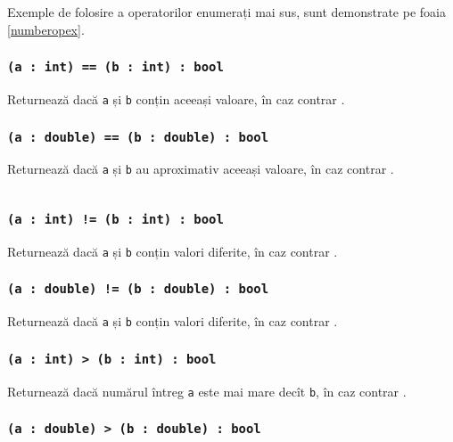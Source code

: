 Exemple de folosire a operatorilor enumerați mai sus, sunt demonstrate pe foaia \ref{numberopex}.

\subsubsection{\texttt{(a : int) == (b : int) : bool}}

Returnează \true{} dacă \texttt{a} și \texttt{b} conțin aceeași valoare, în caz contrar \false{}.

\subsubsection{\texttt{(a : double) == (b : double) : bool}}

Returnează \true{} dacă \texttt{a} și \texttt{b} au aproximativ aceeași valoare, în caz contrar \false{}.

\begin{sourcecode}
\label{numberopex}
\inputminted[linenos]{icl}{../sources/numberopex.icL}
\end{sourcecode}

\subsubsection{\texttt{(a : int) != (b : int) : bool}}

Returnează \true{} dacă \texttt{a} și \texttt{b} conțin valori diferite, în caz contrar \false{}.

\subsubsection{\texttt{(a : double) != (b : double) : bool}}

Returnează \true{} dacă \texttt{a} și \texttt{b} conțin valori diferite, în caz contrar \false{}.

\subsubsection{\texttt{(a : int) > (b : int) : bool}}

Returnează \true{} dacă numărul întreg \texttt{a} este mai mare decît \texttt{b}, în caz contrar \false{}.

\subsubsection{\texttt{(a : double) > (b : double) : bool}}

